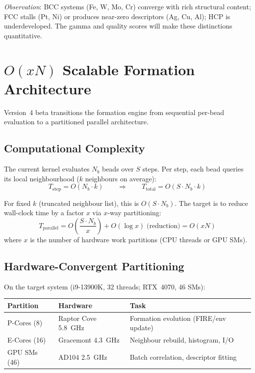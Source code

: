 \documentclass[11pt]{article}
\newcommand{\var}[1]{\ensuremath{\mathrm{#1}}}
\begin{document}
\noindent
\textit{Observation}: BCC systems (Fe, W, Mo, Cr) converge with rich
structural content; FCC stalls (Pt, Ni) or produces near-zero descriptors
(Ag, Cu, Al); HCP is underdeveloped.
The gamma and quality scores will make these distinctions quantitative.

\section{$O(xN)$ Scalable Formation Architecture}
\label{sec:scalability}

Version~4 beta transitions the formation engine from sequential per-bead
evaluation to a partitioned parallel architecture.

\subsection{Computational Complexity}

The current kernel evaluates $N_b$ beads over $S$ steps.
Per step, each bead queries its local neighbourhood
($k$ neighbours on average):
\begin{equation}
  T_\var{step} = O(N_b \cdot k)
  \qquad\Rightarrow\qquad
  T_\var{total} = O(S \cdot N_b \cdot k)
\end{equation}

For fixed $k$ (truncated neighbour list), this is $O(S \cdot N_b)$.
The target is to reduce wall-clock time by a factor $x$ via
$x$-way partitioning:
\begin{equation}
  T_\var{parallel} = O\!\left(\frac{S \cdot N_b}{x}\right)
  + O(\log x) \;\text{(reduction)}
  = O(xN)
\end{equation}
where $x$ is the number of hardware work partitions (CPU threads or GPU SMs).

\subsection{Hardware-Convergent Partitioning}

On the target system (i9-13900K, 32 threads; RTX~4070, 46 SMs):

\begin{center}
\begin{tabular}{lll}
\toprule
\textbf{Partition} & \textbf{Hardware} & \textbf{Task} \\
\midrule
P-Cores (8)  & Raptor Cove 5.8~GHz & Formation evolution (FIRE/env update) \\
E-Cores (16) & Gracemont 4.3~GHz   & Neighbour rebuild, histogram, I/O \\
GPU SMs (46) & AD104 2.5~GHz       & Batch correlation, descriptor fitting \\
\bottomrule
\end{tabular}
\end{center}
\end{document}
